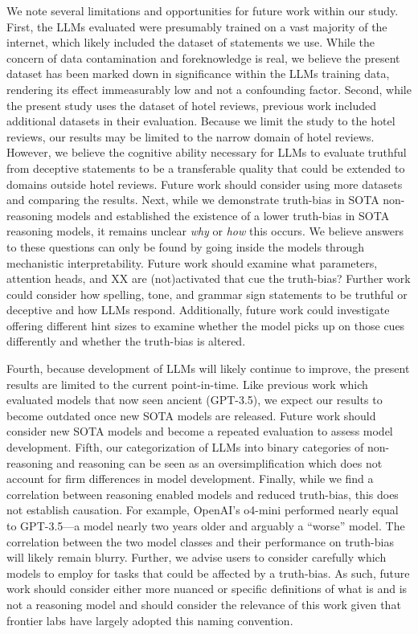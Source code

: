 \documentclass{article}
\begin{document}
We note several limitations and opportunities for future work within our study. First, the LLMs evaluated were presumably trained on a vast majority of the internet, which likely included the dataset of statements we use. While the concern of data contamination and foreknowledge is real, we believe the present dataset has been marked down in significance within the LLMs training data, rendering its effect immeasurably low and not a confounding factor. Second, while the present study uses the dataset of hotel reviews, previous work \citep{markowitz_generative_2024} included additional datasets in their evaluation. Because we limit the study to the hotel reviews, our results may be limited to the narrow domain of hotel reviews. However, we believe the cognitive ability necessary for LLMs to evaluate truthful from deceptive statements to be a transferable quality that could be extended to domains outside hotel reviews. Future work should consider using more datasets and comparing the results. Next, while we demonstrate truth-bias in SOTA non-reasoning models and established the existence of a lower truth-bias in SOTA reasoning models, it remains unclear \textit{why} or \textit{how} this occurs. We believe answers to these questions can only be found by going inside the models through mechanistic interpretability. Future work should examine what parameters, attention heads, and XX are (not)activated that cue the truth-bias? Further work could consider how spelling, tone, and grammar sign statements to be truthful or deceptive and how LLMs respond. Additionally, future work could investigate offering different hint sizes to examine whether the model picks up on those cues differently and whether the truth-bias is altered.

Fourth, because development of LLMs will likely continue to improve, the present results are limited to the current point-in-time. Like previous work which evaluated models that now seen ancient (GPT-3.5), we expect our results to become outdated once new SOTA models are released. Future work should consider new SOTA models and become a repeated evaluation to assess model development. Fifth, our categorization of LLMs into binary categories of non-reasoning and reasoning can be seen as an oversimplification which does not account for firm differences in model development. Finally, while we find a correlation between reasoning enabled models and reduced truth-bias, this does not establish causation. For example, OpenAI's o4-mini performed nearly equal to GPT-3.5---a model nearly two years older and arguably a ``worse'' model. The correlation between the two model classes and their performance on truth-bias will likely remain blurry. Further, we advise users to consider carefully which models to employ for tasks that could be affected by a truth-bias. As such, future work should consider either more nuanced or specific definitions of what is and is not a reasoning model and should consider the relevance of this work given that frontier labs have largely adopted this naming convention.
\end{document}
